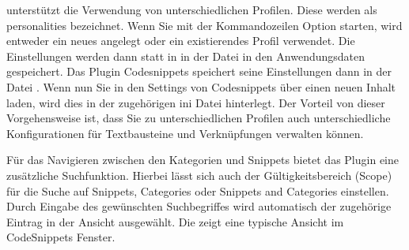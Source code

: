 \codeblocks unterstützt die Verwendung von unterschiedlichen Profilen. Diese werden als personalities bezeichnet. Wenn Sie \codeblocks mit der Kommandozeilen Option  starten, wird entweder ein neues angelegt oder ein existierendes Profil verwendet. Die Einstellungen werden dann statt in  in der Datei  in den Anwendungsdaten gespeichert. Das Plugin Codesnippets speichert seine Einstellungen dann in der Datei . Wenn nun Sie in den Settings von Codesnippets über  einen neuen Inhalt  laden, wird dies in der zugehörigen ini Datei hinterlegt. Der Vorteil von dieser Vorgehensweise ist, dass Sie zu unterschiedlichen Profilen auch unterschiedliche Konfigurationen für Textbausteine und Verknüpfungen verwalten können.

Für das Navigieren zwischen den Kategorien und Snippets bietet das Plugin eine zusätzliche Suchfunktion. Hierbei lässt sich auch der Gültigkeitsbereich (Scope) für die Suche auf Snippets, Categories oder Snippets and Categories einstellen. Durch Eingabe des gewünschten Suchbegriffes wird automatisch der zugehörige Eintrag in der Ansicht ausgewählt. Die  zeigt eine typische Ansicht im CodeSnippets Fenster.

